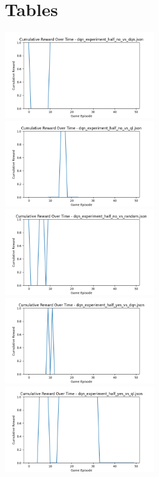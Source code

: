 \newpage
\section{Tables}
\renewcommand{\thetable}{\thesection \arabic{table}}
\setcounter{table}{0}

\includegraphics[width=0.5\textwidth]{images/cumulative_reward_dqn_experiment_half_no_vs_dqn.png} 
\includegraphics[width=0.5\textwidth]{images/cumulative_reward_dqn_experiment_half_no_vs_ql.png} 
\includegraphics[width=0.5\textwidth]{images/cumulative_reward_dqn_experiment_half_no_vs_random.png} 
\includegraphics[width=0.5\textwidth]{images/cumulative_reward_dqn_experiment_half_yes_vs_dqn.png} 
\includegraphics[width=0.5\textwidth]{images/cumulative_reward_dqn_experiment_half_yes_vs_ql.png} 
